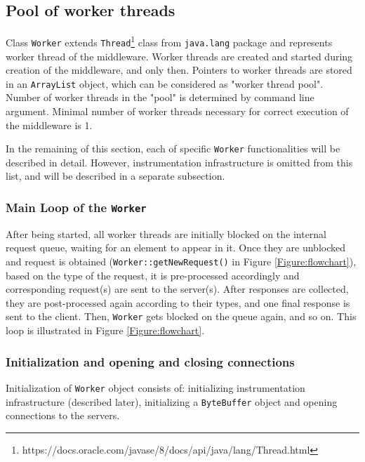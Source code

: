 \documentclass[11pt,a4paper]{article}
\begin{document}
\subsection{Pool of worker threads}

Class \texttt{Worker} extends \texttt{Thread}\footnote{https://docs.oracle.com/javase/8/docs/api/java/lang/Thread.html} class from \texttt{java.lang} package and represents worker thread of the middleware. Worker threads are created and started during creation of the middleware, and only then. Pointers to worker threads are stored in an \texttt{ArrayList} object, which can be considered as "worker thread pool". Number of worker threads in the "pool" is determined by command line argument. Minimal number of worker threads necessary for correct execution of the middleware is 1.

In the remaining of this section, each of specific \texttt{Worker} functionalities will be described in detail. However, instrumentation infrastructure is omitted from this list, and will be described in a separate subsection.

\subsubsection{Main Loop of the \texttt{Worker}}

After being started, all worker threads are initially blocked on the internal request queue, waiting for an element to appear in it. Once they are unblocked and request is obtained (\texttt{Worker::getNewRequest()} in Figure \ref{Figure:flowchart}), based on the type of the request, it is pre-processed accordingly and corresponding request(s) are sent to the server(s). After responses are collected, they are post-processed again according to their types, and one final response is sent to the client. Then, \texttt{Worker} gets blocked on the queue again, and so on. This loop is illustrated in Figure \ref{Figure:flowchart}.

\subsubsection{Initialization and opening and closing connections}

Initialization of \texttt{Worker} object consists of: initializing instrumentation infrastructure (described later), initializing a \texttt{ByteBuffer} object and opening connections to the servers.
\end{document}

